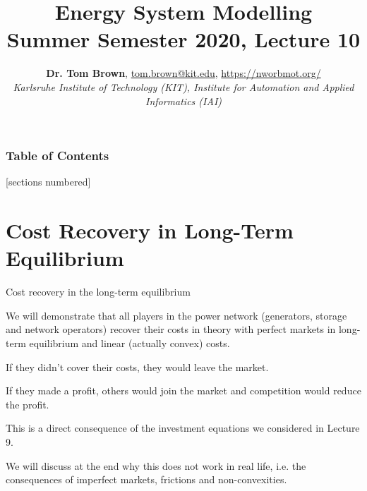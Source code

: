 \documentclass[10pt,aspectratio=169,dvipsnames]{beamer}
\title{Energy System Modelling\\ Summer Semester 2020, Lecture 10}
\author{
  {\bf Dr. Tom Brown}, \href{mailto:tom.brown@kit.edu}{tom.brown@kit.edu}, \url{https://nworbmot.org/}\\
  \emph{Karlsruhe Institute of Technology (KIT), Institute for Automation and Applied Informatics (IAI)}
}
\date{}
\begin{document}
\maketitle


\begin{frame}

  \frametitle{Table of Contents}
  [sections numbered]
  \tableofcontents[hideallsubsections]
\end{frame}



\section{Cost Recovery in Long-Term Equilibrium}


\begin{frame}{Cost recovery in the long-term equilibrium}

  We will demonstrate that all players in the power network
  (generators, storage and network operators) \alert{recover their
    costs} in theory with perfect markets in long-term equilibrium and
  linear (actually convex) costs.

  If they didn't cover their costs, they would leave the market.

  If they made a profit, others would join the market and competition would reduce the profit.

  This is a direct consequence of the investment equations we considered in Lecture 9.

  We will discuss at the end why this \alert{does not work in real life}, i.e. the consequences of imperfect markets, frictions  and non-convexities.
\end{frame}
\end{document}
